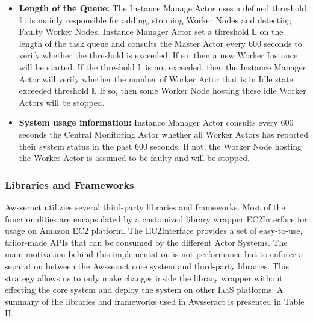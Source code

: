 \documentclass[conference]{IEEEtran}
\begin{document}
\begin{itemize}
  \item \textbf{Length of the Queue:} The Instance Manage Actor uses a defined threshold $\mathbb{L}$. is mainly responsible for adding, stopping Worker Nodes and detecting Faulty Worker Nodes. Instance Manager Actor set a threshold $\mathbb{L}$ on the length of the task queue and consults the Master Actor every 600 seconds to verify whether the threshold is exceeded. If so, then a new Worker Instance will be started. If the threshold $\mathbb{L}$ is not exceeded, then the Instance Manager Actor will verify whether the number of Worker Actor that is in Idle state exceeded threshold $\mathbb{I}$. If so, then some Worker Node hosting these idle Worker Actors will be stopped.
  \item \textbf{System usage information:} Instance Manager Actor consults every 600 seconds the Central Monitoring Actor whether all Worker Actors has reported their system status in the past 600 seconds. If not, the Worker Node hosting the Worker Actor is assumed to be faulty and will be stopped. \\
\end{itemize} 


\subsubsection{Libraries and Frameworks}\label{sec:sysdesign_lib}
 Awsseract utilizies several third-party libraries and frameworks. Most of the functionalities are encapsulated by a customized library wrapper EC2Interface for usage on Amazon EC2 platform. The EC2Interface provides a set of easy-to-use, tailor-made APIs that can be consumed by the different Actor Systems. The main motivation behind this implementation is not performance but to enforce a separation between the Awsseract core system and third-party libraries. This strategy allows us to only make changes inside the library wrapper without effecting the core system and deploy the system on other IaaS platforms. A summary of the libraries and frameworks used in Awsseract is presented in Table II. \\
\end{document}
